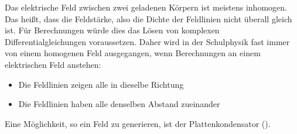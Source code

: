 Das elektrische Feld zwischen zwei geladenen Körpern ist meistens inhomogen. Das heißt, dass die Feldstärke, also die Dichte der Feldlinien nicht überall gleich ist. Für Berechnungen würde dies das Lösen von komplexen Differentialgleichungen voraussetzen. Daher wird in der Schulphysik fast immer von einem homogenen Feld ausgegangen, wenn Berechnungen an einem elektrischen Feld anstehen:

\begin{itemize}
	\item Die Feldlinien zeigen alle in dieselbe Richtung
	\item Die Feldlinien haben alle denselben Abstand zueinander
\end{itemize} 

Eine Möglichkeit, so ein Feld zu generieren, ist der Plattenkondensator ().





